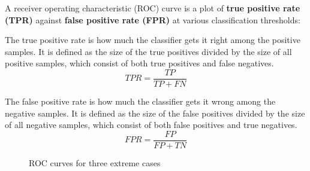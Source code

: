 \documentclass[12pt]{article}
\begin{document}
A receiver operating characteristic (ROC) curve is a plot of \textbf{true positive rate (TPR)} against \textbf{false positive rate (FPR)} at various classification thresholds:
\bi
\item The true positive rate is how much the classifier gets it right among the positive samples. It is defined as the size of the true positives divided by the size of all positive samples, which consist of both true positives and false negatives.
 \[TPR = \frac{TP}{TP + FN}\]
\item The false positive rate is how much the classifier gets it wrong among the negative samples. It is defined as the size of the false positives divided by the size of all negative samples, which consist of both false positives and true negatives.
\[FPR = \frac{FP}{FP + TN}\]
\ei
\begin{figure}
\centering
{}

\caption{ROC curves for three extreme cases}
\end{figure}
\end{document}
